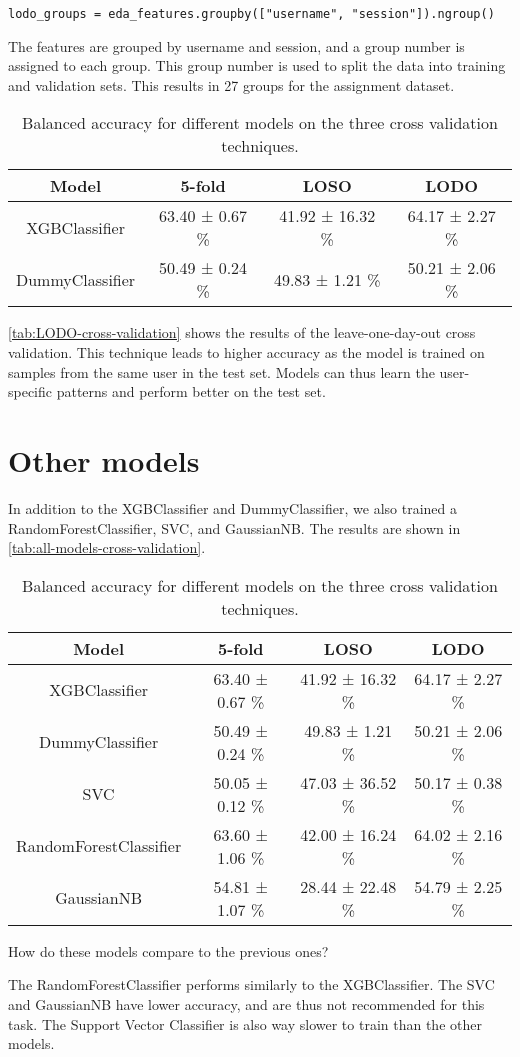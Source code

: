 \documentclass{usireport}
\begin{document}
\begin{verbatim}
lodo_groups = eda_features.groupby(["username", "session"]).ngroup()
\end{verbatim}

The features are grouped by username and session, and a group number is assigned to each group. This group number is used to split the data into training and validation sets. This results in 27 groups for the assignment dataset.

\begin{table}[H]
    \centering
    \begin{tabular}{|c|c|c|c|}
        \hline
        \textbf{Model} & \textbf{5-fold} & \textbf{LOSO} & \textbf{LODO} \\
        \hline
        XGBClassifier & 63.40 ± 0.67 \% & 41.92 ± 16.32 \% & 64.17 ± 2.27 \% \\
        DummyClassifier & 50.49 ± 0.24 \% & 49.83 ± 1.21 \% & 50.21 ± 2.06 \% \\

        \hline
    \end{tabular}
    \caption{Balanced accuracy for different models on the three cross validation techniques.}
    \label{tab:LODO-cross-validation}
\end{table}

\autoref{tab:LODO-cross-validation} shows the results of the leave-one-day-out cross validation. This technique leads to higher accuracy as the model is trained on samples from the same user in the test set. Models can thus learn the user-specific patterns and perform better on the test set.

\section{Other models}

In addition to the XGBClassifier and DummyClassifier, we also trained a RandomForestClassifier, SVC, and GaussianNB. The results are shown in \autoref{tab:all-models-cross-validation}.

\begin{table}[H]
    \centering
    \begin{tabular}{|c|c|c|c|}
        \hline
        \textbf{Model} & \textbf{5-fold} & \textbf{LOSO} & \textbf{LODO} \\
        \hline
        XGBClassifier & 63.40 ± 0.67 \% & 41.92 ± 16.32 \% & 64.17 ± 2.27 \% \\
        DummyClassifier & 50.49 ± 0.24 \% & 49.83 ± 1.21 \% & 50.21 ± 2.06 \% \\
        SVC & 50.05 ± 0.12 \% & 47.03 ± 36.52 \% & 50.17 ± 0.38 \% \\
        RandomForestClassifier & 63.60 ± 1.06 \% & 42.00 ± 16.24 \% & 64.02 ± 2.16 \% \\
        GaussianNB & 54.81 ± 1.07 \% & 28.44 ± 22.48 \% & 54.79 ± 2.25 \% \\
        \hline
    \end{tabular}
    \caption{Balanced accuracy for different models on the three cross validation techniques.}
    \label{tab:all-models-cross-validation}
\end{table}

How do these models compare to the previous ones?

The RandomForestClassifier performs similarly to the XGBClassifier. The SVC and GaussianNB have lower accuracy, and are thus not recommended for this task. The Support Vector Classifier is also way slower to train than the other models.
\end{document}
